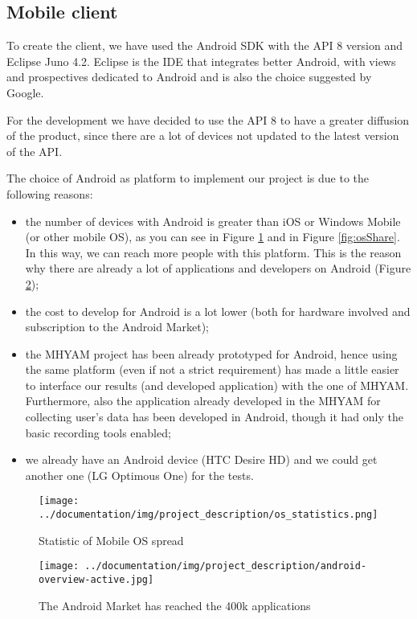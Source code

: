 \subsection{Mobile client}

To create the client, we have used the Android SDK with the API 8 version and Eclipse Juno 4.2. Eclipse is the IDE that integrates better Android, with views and prospectives dedicated to Android and is also the choice suggested by Google.

For the development we have decided to use the API 8 to have a greater diffusion of the product, since there are a lot of devices not updated to the latest version of the API. 

The choice of Android as platform to implement our project is due to the following reasons:
\begin{itemize}
\item the number of devices with Android is greater than iOS or Windows Mobile (or other mobile OS), as you can see in Figure \ref{fig:tableOsStatistics} and in Figure \ref{fig:osShare}. In this way, we can reach more people with this platform. This is the reason why there are already a lot of applications and developers on Android (Figure \ref{fig:over400k});
\item the cost to develop for Android is a lot lower (both for hardware involved and subscription to the Android Market);
\item the MHYAM project \cite{MHYAM} has been already prototyped for Android, hence using the same platform (even if not a strict requirement) has made a little easier to interface our results (and developed application) with the one of MHYAM. Furthermore, also the application already developed in the MHYAM for collecting user's data has been developed in Android, though it had only the basic recording tools enabled;
\item we already have an Android device (HTC Desire HD) and we could get another one (LG Optimous One) for the tests.
\end{itemize}

\begin{figure}[H]
\centering %
\texttt{[image: ../documentation/img/project\_description/os\_statistics.png]}
\caption{Statistic of Mobile OS spread}
\label{fig:tableOsStatistics}
\end{figure}

\begin{figure}[H]
\centering %
\texttt{[image: ../documentation/img/project\_description/android-overview-active.jpg]}
\caption{The Android Market has reached the 400k applications}
\label{fig:over400k}
\end{figure}

